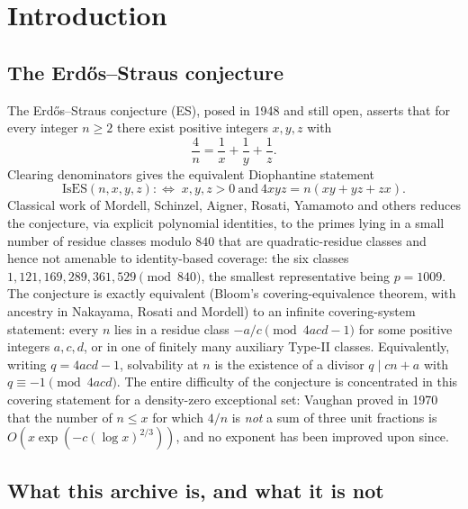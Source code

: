 \documentclass[11pt]{article}
\theoremstyle{plain}
\theoremstyle{definition}
\theoremstyle{remark}
\renewcommand{\_}{\textunderscore\allowbreak}
\begin{document}
\tableofcontents


\section{Introduction}
\label{sec:intro}

\subsection{The Erd\H{o}s--Straus conjecture}

The Erd\H{o}s--Straus conjecture (ES), posed in 1948 and still open, asserts that for every
integer $n\ge 2$ there exist positive integers $x,y,z$ with
\[
\frac{4}{n} = \frac{1}{x}+\frac{1}{y}+\frac{1}{z}.
\]
Clearing denominators gives the equivalent Diophantine statement
\[
\mathrm{IsES}(n,x,y,z) :\iff\; x,y,z>0 \ \text{and}\ 4xyz = n(xy+yz+zx).
\]
Classical work of Mordell, Schinzel, Aigner, Rosati, Yamamoto and others reduces the conjecture,
via explicit polynomial identities, to the primes lying in a small number of residue classes
modulo $840$ that are quadratic-residue classes and hence not amenable to identity-based
coverage: the six classes $1,121,169,289,361,529 \pmod{840}$, the smallest representative being
$p=1009$. The conjecture is exactly equivalent (Bloom's covering-equivalence theorem, with
ancestry in Nakayama, Rosati and Mordell) to an infinite covering-system statement: every
$n$ lies in a residue class $-a/c \pmod{4acd-1}$ for some positive integers $a,c,d$, or in one
of finitely many auxiliary Type-II classes. Equivalently, writing $q=4acd-1$, solvability at $n$
is the existence of a divisor $q\mid cn+a$ with $q\equiv -1\pmod{4ac d}$. The entire difficulty
of the conjecture is concentrated in this covering statement for a density-zero exceptional set:
Vaughan proved in 1970 that the number of $n\le x$ for which $4/n$ is \emph{not} a sum of three
unit fractions is $O\!\left(x\exp(-c(\log x)^{2/3})\right)$, and no exponent has been improved
upon since.

\subsection{What this archive is, and what it is not}
\label{subsec:whatitis}
\end{document}
